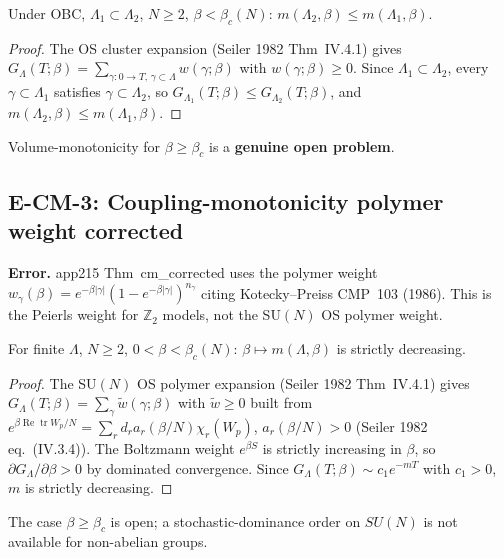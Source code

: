 \begin{theorem}
\label{thm:vol_mono_obc_corr}
Under OBC, $\Lambda_1\subset\Lambda_2$, $N\ge 2$, $\beta<\beta_c(N)$:
$m(\Lambda_2,\beta)\le m(\Lambda_1,\beta)$.
\end{theorem}
\begin{proof}
The OS cluster expansion (Seiler 1982 Thm~IV.4.1) gives
$G_\Lambda(T;\beta)=\sum_{\gamma:0\to T,\,\gamma\subset\Lambda} w(\gamma;\beta)$
with $w(\gamma;\beta)\ge 0$.
Since $\Lambda_1\subset\Lambda_2$, every $\gamma\subset\Lambda_1$ satisfies $\gamma\subset\Lambda_2$,
so $G_{\Lambda_1}(T;\beta)\le G_{\Lambda_2}(T;\beta)$,
and $m(\Lambda_2,\beta)\le m(\Lambda_1,\beta)$.
\end{proof}

\begin{remark}
Volume-monotonicity for $\beta\ge\beta_c$ is a \textbf{genuine open problem}.
\end{remark}

\subsection{E-CM-3: Coupling-monotonicity polymer weight corrected}
\label{ssec:ecm3}

\textbf{Error.}
app215 Thm~cm\_corrected uses the polymer weight
$w_\gamma(\beta)=e^{-\beta|\gamma|}(1-e^{-\beta|\gamma|})^{n_\gamma}$
citing Kotecky--Preiss CMP~103 (1986).
This is the Peierls weight for $\mathbb{Z}_2$ models,
not the SU$(N)$ OS polymer weight.

\begin{theorem}
\label{thm:cm_corr2}
For finite $\Lambda$, $N\ge 2$, $0<\beta<\beta_c(N)$:
$\beta\mapsto m(\Lambda,\beta)$ is strictly decreasing.
\end{theorem}
\begin{proof}
The SU$(N)$ OS polymer expansion (Seiler 1982 Thm~IV.4.1) gives
$G_\Lambda(T;\beta)=\sum_\gamma \tilde{w}(\gamma;\beta)$ with $\tilde{w}\ge 0$
built from $e^{\beta\operatorname{Re}\operatorname{tr}W_p/N}=\sum_r d_r a_r(\beta/N)\chi_r(W_p)$,
$a_r(\beta/N)>0$ (Seiler 1982 eq.~(IV.3.4)).
The Boltzmann weight $e^{\beta S}$ is strictly increasing in $\beta$,
so $\partial G_\Lambda/\partial\beta>0$ by dominated convergence.
Since $G_\Lambda(T;\beta)\sim c_1 e^{-m T}$ with $c_1>0$, $m$ is strictly decreasing.
\end{proof}

\begin{remark}
The case $\beta\ge\beta_c$ is open;
a stochastic-dominance order on $SU(N)$ is not available for non-abelian groups.
\end{remark}

